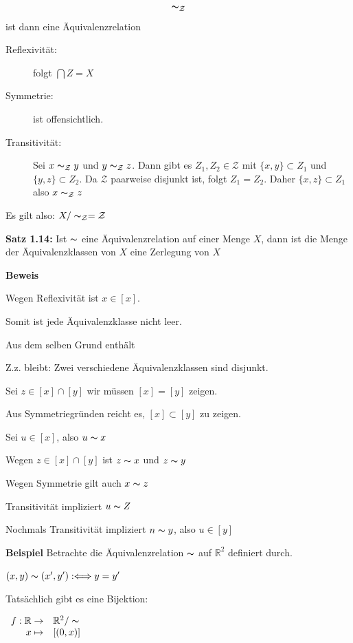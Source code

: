 \documentclass{scrartcl}
\begin{document}
\[\thicksim_{\mathcal{Z}}\] ist dann eine Äquivalenzrelation

\begin{description}
  \item[Reflexivität:] folgt $\bigcap Z = X$
  \item[Symmetrie:] ist offensichtlich.
  \item[Transitivität:] Sei $x \thicksim_{\mathcal{Z}} y$ und $y \thicksim_{\mathcal{Z}} z$. Dann gibt es $Z_1,Z_2 \in \mathcal{Z}$ mit $\{x,y\} \subset Z_1$ und $\{y,z\} \subset Z_2$. Da $\mathcal{Z}$ paarweise disjunkt ist, folgt $Z_1=Z_2$. Daher $\{x,z\}\subset Z_1$ also $x \thicksim_{\mathcal{Z}} z$
\end{description}

Es gilt also: $X/\thicksim_{\mathcal{Z}} = \mathcal{Z}$

\textbf{Satz 1.14:} Ist $\thicksim$ eine Äquivalenzrelation auf einer Menge $X$, dann ist die Menge der Äquivalenzklassen von $X$ eine Zerlegung von $X$ 

\textbf{Beweis}

Wegen Reflexivität ist $x\in[x]$.

Somit ist jede Äquivalenzklasse nicht leer.

Aus dem selben Grund enthält 

Z.z. bleibt: Zwei verschiedene Äquivalenzklassen sind disjunkt.

Sei $z \in [x] \cap [y]$ wir müssen $[x]=[y]$ zeigen.

Aus Symmetriegründen reicht es, $[x] \subset [y]$ zu zeigen.

Sei $u \in [x]$, also $u \thicksim x$

Wegen $z \in [x] \cap [y]$ ist $z \thicksim x$ und $z \thicksim y$

Wegen Symmetrie gilt auch $x \thicksim z$

Transitivität impliziert $u \thicksim Z$

Nochmals Transitivität impliziert $n\thicksim y$, also $u \in [y]$ 

\textbf{Beispiel} Betrachte die Äquivalenzrelation $\thicksim$ auf $\mathbb{R}^2$ definiert durch.

$(x,y) \thicksim (x',y') : \Longleftrightarrow y=y'$

Tatsächlich gibt es eine Bijektion:

$\begin{array}{rl}
    f: \mathbb{R} \to & \mathbb{R}^2/\thicksim \\
    x \mapsto & [(0,x)]
\end{array}$
\end{document}

